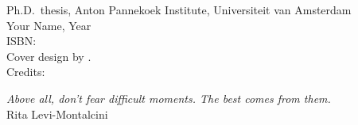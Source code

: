 
\cleardoublepage
\thispagestyle{empty}
{\raggedright
  \small
  \noindent Ph.D.~thesis, Anton Pannekoek Institute, Universiteit van Amsterdam\\
  \noindent Your Name, Year\\[3ex]

  \noindent ISBN:  \\[3ex]


  \noindent Cover design by .\\
  \noindent Credits:

}



\cleardoublepage
\thispagestyle{empty}
\null\vfill\null

\hfill\parbox{125mm}{
\raggedleft\emph{\large Above all, don’t fear difficult moments. The best comes from them.}\\[5pt]
Rita Levi-Montalcini 
}
\vfill
\clearpage
\thispagestyle{empty}
\newpage
\phantom{let's kill those trees}


\pagestyle{fancy}

